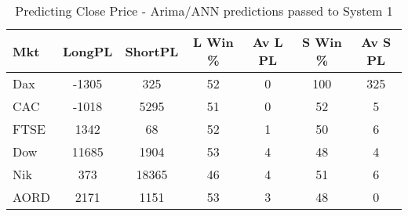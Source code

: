 \begin{table}[ht]
\centering
\caption[Predicting Close Price - Arima/ANN predictions passed to System 1.]{Predicting Close Price - Arima/ANN predictions passed to System 1} 
\label{tab:chp_ts:arima_ann_sys1}
\begin{tabular}{lcccccc}
  \toprule Mkt & LongPL & ShortPL & L Win \% & Av L PL & S Win \% & Av S PL \\ 
  \midrule Dax & -1305 & 325 & 52 & 0 & 100 & 325 \\ 
  CAC & -1018 & 5295 & 51 & 0 & 52 & 5 \\ 
  FTSE & 1342 & 68 & 52 & 1 & 50 & 6 \\ 
  Dow & 11685 & 1904 & 53 & 4 & 48 & 4 \\ 
  Nik & 373 & 18365 & 46 & 4 & 51 & 6 \\ 
  AORD & 2171 & 1151 & 53 & 3 & 48 & 0 \\ 
   \bottomrule \end{tabular}
\end{table}

